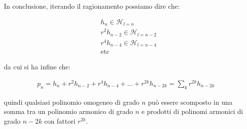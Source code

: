 	In conclusione, iterando il ragionamento possiamo dire che:
	
\begin{align*}
	& h_n \in \mathcal{H}_{l = n} \\
	& r^2 h_{n-2} \in \mathcal{H}_{l = n - 2} \\
	& r^4 h_{n-4} \in \mathcal{H}_{l = n - 4} \\
	& \text{etc}
\end{align*}

	da cui si ha infine che:
	
\begin{align*}
	p_n = h_n + r^2 h_{n-2} + r^4 h_{n-4} + \dots + r^{2k} h_{n-2k} = \sum_k r^{2k} h_{n-2k}
\end{align*}

	quindi qualsiasi polinomio omogeneo di grado $n$ può essere scomposto in una somma tra un polinomio armonico di grado $n$ e prodotti di polinomi armonici di grado $n-2k$ con fattori $r^{2k}$.

